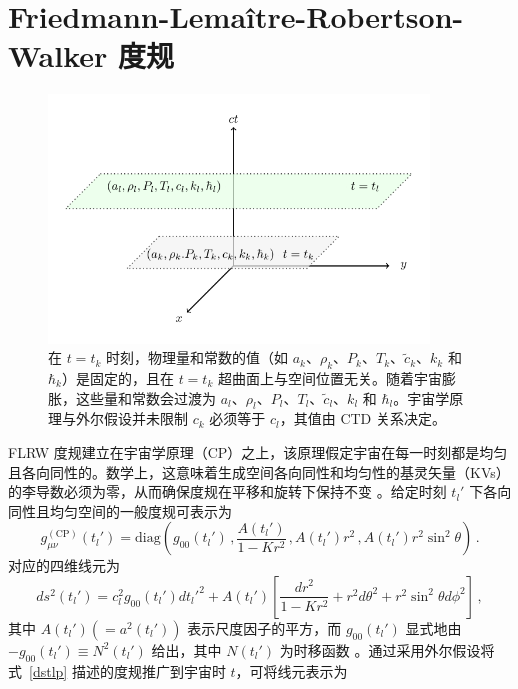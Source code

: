 \documentclass[jkps,preprint,fleqn]{revtex4}
\newcommand{\tc}{\tilde{c}}
\begin{document}
\section{Friedmann-Lemaître-Robertson-Walker 度规}
\label{sec:RWm}
\begin{figure}
	\begin{center}
	\includegraphics[width=0.9\textwidth]{Fig1.pdf}
	\caption{在 $t = t_k$ 时刻，物理量和常数的值（如 $a_k$、$\rho_k$、$P_k$、$T_k$、$\tc_k$、$k_{k}$ 和 $\hbar_k$）是固定的，且在 $t=t_k$ 超曲面上与空间位置无关。随着宇宙膨胀，这些量和常数会过渡为 $a_l$、$\rho_l$、$P_l$、$T_l$、$\tc_l$、$k_l$ 和 $\hbar_l$。宇宙学原理与外尔假设并未限制 $c_k$ 必须等于 $c_l$，其值由 CTD 关系决定。}
	\label{Fig1}
	\end{center}
\end{figure}
FLRW 度规建立在宇宙学原理（CP）之上，该原理假定宇宙在每一时刻都是均匀且各向同性的。数学上，这意味着生成空间各向同性和均匀性的基灵矢量（KVs）的李导数必须为零，从而确保度规在平移和旋转下保持不变 \cite{Lee:2024mal,Ryder09}。给定时刻 $t_l'$ 下各向同性且均匀空间的一般度规可表示为
\begin{equation}
g_{\mu\nu}^{(\text{CP})}(t_l') = \text{diag} \left( g_{00}(t_l') \,,  \frac{A(t_l')}{1-Kr^2} \,,  A(t_l') r^2 \,,  A(t_l') r^2 \sin^2 \theta \right) \,.
\end{equation}
对应的四维线元为
\begin{equation}
ds^2(t_l') = c_l^2 g_{00}(t_l') dt_l'^2 + A(t_l') \left[ \frac{dr^2}{1-Kr^2} + r^2 d \theta^2 + r^2 \sin^2 \theta d \phi^2 \right] \label{dstlp} \,,
\end{equation}
其中 $A(t_l') (= a^2(t_l'))$ 表示尺度因子的平方，而 \( g_{00}(t_l') \) 显式地由 \(- g_{00}(t_l') \equiv N^2(t_l') \) 给出，其中 \( N(t_l') \) 为时移函数 \cite{Lee:2024zcu,Ryder09}。通过采用外尔假设将式~\eqref{dstlp} 描述的度规推广到宇宙时 $t$，可将线元表示为
\end{document}
